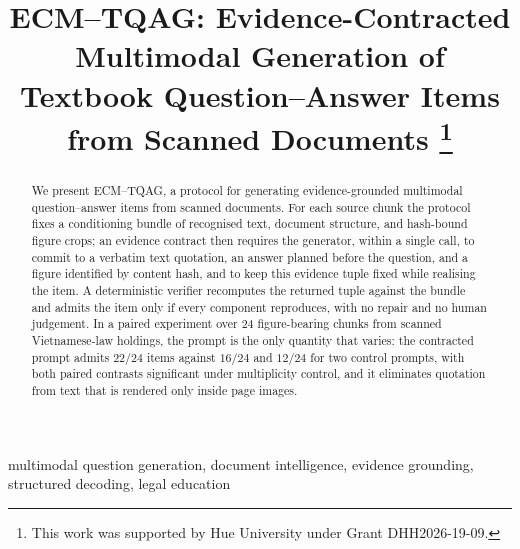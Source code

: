 \documentclass[conference]{IEEEtran}
\begin{document}
\title{ECM--TQAG: Evidence-Contracted Multimodal Generation of\\Textbook Question--Answer Items from Scanned Documents%
\thanks{This work was supported by Hue University under Grant DHH2026-19-09.}}
\author{
\and
{}
\and
{}
\and
{}
\and
{}
\and
{}
}
\maketitle
{}

\begin{abstract}
We present ECM--TQAG, a protocol for generating evidence-grounded
multimodal question--answer items from scanned documents. For each
source chunk the protocol fixes a conditioning bundle of recognised
text, document structure, and hash-bound figure crops; an evidence
contract then requires the generator, within a single call, to commit
to a verbatim text quotation, an answer planned before the question,
and a figure identified by content hash, and to keep this evidence
tuple fixed while realising the item. A deterministic verifier
recomputes the returned tuple against the bundle and admits the item
only if every component reproduces, with no repair and no human
judgement. In a paired experiment over 24 figure-bearing chunks from
scanned Vietnamese-law holdings, the prompt is the only quantity that
varies: the contracted prompt admits $22/24$ items against $16/24$ and
$12/24$ for two control prompts, with both paired contrasts significant
under multiplicity control, and it eliminates quotation from text that
is rendered only inside page images.
\end{abstract}
\begin{IEEEkeywords}
multimodal question generation, document intelligence, evidence grounding,
structured decoding, legal education
\end{IEEEkeywords}
\end{document}
